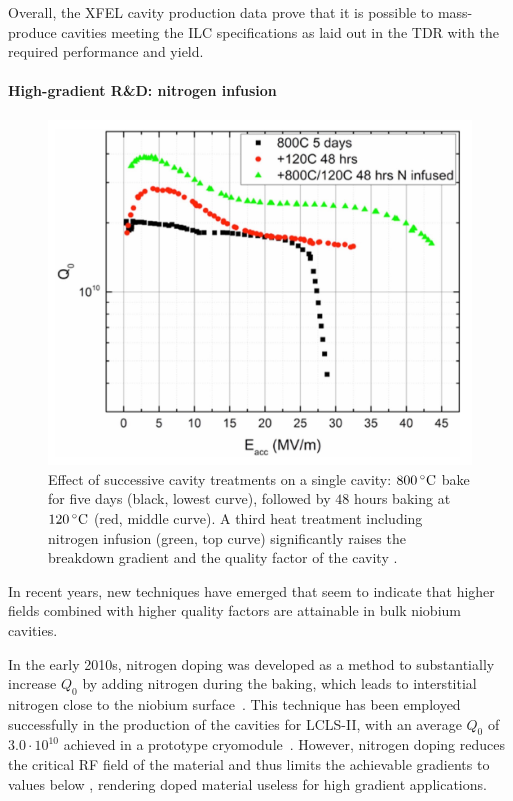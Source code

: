 Overall, the XFEL cavity production data prove that it is possible to mass-produce cavities meeting the ILC specifications as laid out in the TDR with the required performance and yield.


\paragraph{High-gradient R\&D: nitrogen infusion}
\label{par:infusion}

\begin{figure}[htbp]
   \includegraphics[width=\hsize]{chapters/figures/sst-30-094004-fig5}
\caption{Effect of successive cavity treatments on a single cavity: $800\,{\mathrm{^\circ C}}$ bake for five days (black, lowest curve), followed by $48$ hours baking at $120\,{\mathrm{^\circ C}}$ (red, middle curve). 
A third heat treatment including nitrogen infusion (green, top curve) significantly  raises the breakdown gradient and the quality factor of the cavity
\cite[Fig. 5]{Grassellino:2017bod}.
}
\label{fig:n2infusion}
\end{figure}

In recent years, new techniques have emerged that seem to indicate that higher fields combined with higher quality factors are attainable in bulk niobium cavities.

In the early 2010s, nitrogen doping was developed as a method to substantially increase $Q_0$ by adding nitrogen during the  baking, which leads to interstitial nitrogen close to the niobium surface~\cite{Grassellino:2013nza}.
This technique has been employed successfully in the production of the cavities for LCLS-II, with an average $Q_0$ of $3.0\cdot 10^{10}$ achieved in a prototype cryomodule~\cite{Wu:2018qyl}.
However, nitrogen doping reduces the critical RF field of the material and thus limits the achievable gradients to values below , rendering doped material useless for high gradient applications.

